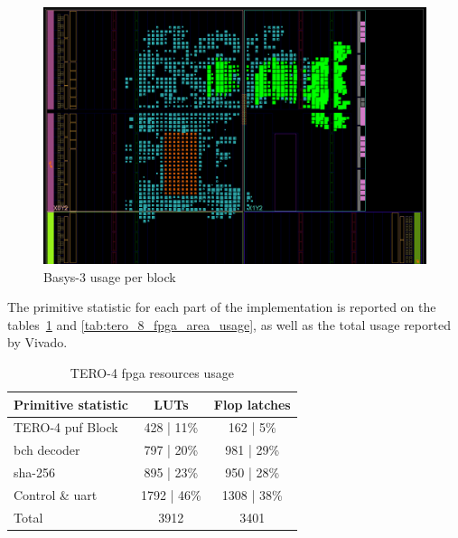 \begin{figure}[H]
\begin{minipage}[b]{0.5\linewidth}
   \end{minipage}\hfill
   \begin{minipage}[b]{0.5\linewidth}   
        \centering
        \includegraphics[width=\linewidth]{images/sha256_area_usage.png}
   \end{minipage}
   \caption{\label{fig:fpga_area_usage_detailled}Basys-3 usage per block}
\end{figure}

The primitive statistic for each part of the implementation is reported on the tables~\ref{tab:tero_4_fpga_area_usage} and \ref{tab:tero_8_fpga_area_usage}, as well as the total usage reported by Vivado.

\begin{table}[H]
    \centering
    \begin{tabular}{|l|c|c|}
         \hline
         \textbf{Primitive statistic} & \textbf{LUTs} & \textbf{Flop latches} \\
         \hline
         TERO-4 \acrshort{puf} Block & 428 | 11\% & 162 | 5\% \\
         \hline
         \acrshort{bch} decoder & 797 | 20\% & 981 | 29\%\\
         \hline
         \acrshort{sha}-256 & 895 | 23\% & 950 | 28\%\\
         \hline
         Control \& \acrshort{uart} & 1792 | 46\% & 1308 | 38\%\\       
         \hline
         Total & 3912 & 3401\\
         \hline
    \end{tabular}
    \caption{TERO-4 \acrshort{fpga} resources usage}
    \label{tab:tero_4_fpga_area_usage}
\end{table}


